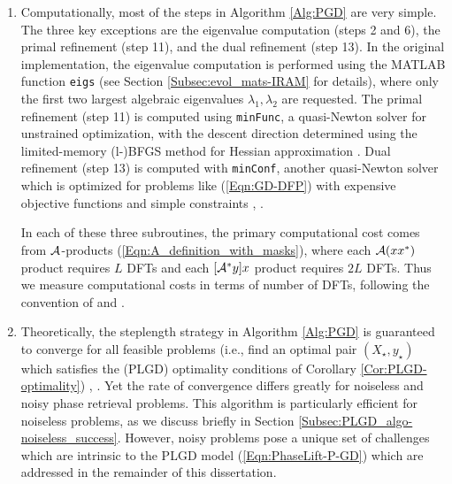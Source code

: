 \begin{enumerate}
\item

Computationally, most of the steps in Algorithm \ref{Alg:PGD} are very simple.  The three key exceptions are the eigenvalue computation (steps 2 and 6), the primal refinement (step 11), and the dual refinement (step 13).  In the original implementation, the eigenvalue computation is performed using the MATLAB function \texttt{eigs} (see Section \ref{Subsec:evol_mats-IRAM} for details), where only the first two largest algebraic eigenvalues $\lambda_1, \lambda_2$ are requested.  The primal refinement (step 11) is computed using \texttt{minFunc}, a quasi-Newton solver for unstrained optimization, with the descent direction determined using the limited-memory (l-)BFGS method for Hessian approximation \cite{schmidt2005minFunc}.  Dual refinement (step 13) is computed with \texttt{minConf}, another quasi-Newton solver which is optimized for problems like (\ref{Eqn:GD-DFP}) with expensive objective functions and simple constraints \cite{schmidt2008minConf}, \cite{schmidt2009optimizing}.

In each of these three subroutines, the primary computational cost comes from ${\mathcal A}$-products (\ref{Eqn:A_definition_with_masks}), where each ${\mathcal A}(xx^*)$ product requires $L$ DFTs and each $[{\mathcal A}^*y]x$ product requires $2L$ DFTs.  Thus we measure computational costs in terms of number of DFTs, following the convention of \cite{DBLP:journals/tit/CandesLS15} and \cite{DBLP:journals/siamsc/FriedlanderM16}.



\item

Theoretically, the steplength strategy in Algorithm \ref{Alg:PGD} is guaranteed to converge for all feasible problems (i.e., find an optimal pair $(X_\star, y_\star)$ which satisfies the (PLGD) optimality conditions of Corollary \ref{Cor:PLGD-optimality}) \cite{zhang2004nonmonotone}, \cite[Proposition 1.2.3 and Section 3.3.1]{bertsekas2016nonlinear}.  Yet the rate of convergence differs greatly for noiseless and noisy phase retrieval problems.  This algorithm is particularly efficient for noiseless problems, as we discuss briefly in Section \ref{Subsec:PLGD_algo-noiseless_success}.  However, noisy problems pose a unique set of challenges which are intrinsic to the PLGD model (\ref{Eqn:PhaseLift-P-GD}) which are addressed in the remainder of this dissertation.




\end{enumerate}







